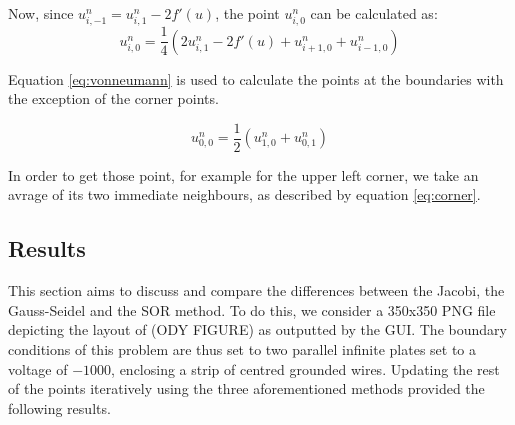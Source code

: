 \documentclass[a4paper]{article}
\begin{document}
Now, since $u^n_{i,-1}=u^n_{i,1}-2f'(u)$, the point $u^n_{i,0}$ can be calculated as:
\begin{equation}
u^n_{i,0}=\frac{1}{4}(2u^n_{i,1}-2f'(u)+u^n_{i+1,0}+u^n_{i-1,0})
\label{eq:vonneumann}
\end{equation}


Equation \ref{eq:vonneumann} is used to calculate the points at the boundaries with the exception of the corner points.

\begin{equation}
u^n_{0,0}=\frac{1}{2}(u^n_{1,0}+u^n_{0,1})
\label{eq:corner}
\end{equation}

In order to get those point, for example for the upper left corner, we take an avrage of its two immediate neighbours, as described by equation \ref{eq:corner}.


\subsection{Results}

This section aims to discuss and compare the differences between the Jacobi, the Gauss-Seidel and the SOR method. To do this, we consider a 350x350 PNG file depicting the layout of (ODY FIGURE) as outputted by the GUI. The boundary conditions of this problem are thus set to two parallel infinite plates set to a voltage of $-1000$, enclosing a strip of centred grounded wires. Updating the rest of the points iteratively using the three aforementioned methods provided the following results.
\end{document}
